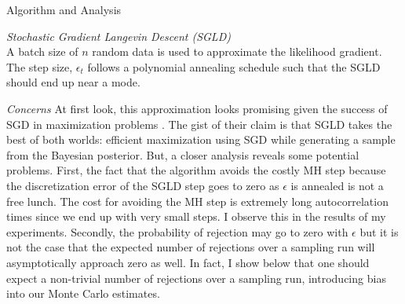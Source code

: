 \documentclass{article}
\begin{document}
\begin{section}{Algorithm and Analysis}
\begin{subsection}{\it Stochastic Gradient Langevin Descent (SGLD)}
\begin{equation}
\end{equation}
A batch size of $n$ random data is used to approximate the likelihood gradient.  The step size, $\epsilon_t$ follows a polynomial annealing schedule such that the SGLD should end up near a mode.
\begin{subsubsection}{\it Concerns}
At first look, this approximation looks promising given the success of SGD in maximization problems \cite{Bottou10}.  The gist of their claim is that SGLD takes the best of both worlds: efficient maximization using SGD while generating a sample from the Bayesian posterior.  But, a closer analysis reveals some potential problems.  First, the fact that the algorithm avoids the costly MH step because the discretization error of the SGLD step goes to zero as $\epsilon$ is annealed is not a free lunch.  The cost for avoiding the MH step is extremely long autocorrelation times since we end up with very small steps.  I observe this in the results of my experiments.  Secondly, the probability of rejection may go to zero with $\epsilon$ but it is not the case that the expected number of rejections over a sampling run will asymptotically approach zero as well.  In fact, I show below that one should expect a non-trivial number of rejections over a sampling run, introducing bias into our Monte Carlo estimates.
\end{subsubsection}
\end{subsection}


\end{section}
\end{document}

